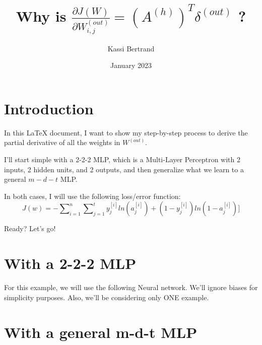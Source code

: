 \documentclass[12pt, letterpaper]{article}
\title{Why is $ \frac{\partial J(W)}{\partial W_{i,j}^{(out)}} = (A^{(h)})^{T} \delta^{(out)}$ ?}
\author{Kassi Bertrand}
\date{January 2023}
\begin{document}
\maketitle

\section{Introduction}
In this \LaTeX{} document, I want to show my step-by-step process
to derive the partial derivative of all the weights in $W^{(out)}$.

\vspace{5mm} %

I'll start simple with a 2-2-2 MLP, which is a Multi-Layer Perceptron
with 2 inputs, 2 hidden units, and 2 outputs, and then generalize
what we learn to a general $m-d-t$ MLP.

\vspace{5mm} %

In both cases, I will use the following loss/error function:
\[J(w) = -\sum\nolimits_{i = 1}^{n}\sum\nolimits_{j=1}^{t} y_j^{[i]} ln(a_j^{[i]}) + (1 - y_j^{[i]})ln(1 - a_j^{[i]})]\]


\vspace{5mm} %

Ready? Let's go!

\section{With a 2-2-2 MLP}

For this example, we will use the following Neural network. We'll
ignore biases for simplicity purposes. Also, we'll be considering
only ONE example.

\section{With a general m-d-t MLP}
\end{document}
